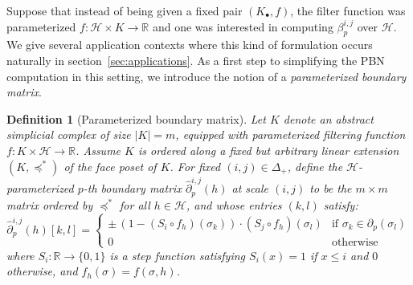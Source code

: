 \documentclass[10pt]{article}
\newcommand{\+}{%
	\raisebox{0.18ex}{\scaleobj{0.55}{+}}
}
\newtheorem{definition}{Definition}
\theoremstyle{definition}
\begin{document}
Suppose that instead of being given a fixed pair $(K_\bullet, f)$, the filter function was parameterized $f : \mathcal{H} \times K \to \mathbb{R}$ and one was interested in computing $\beta_p^{i,j}$ over $\mathcal{H}$. We give several application contexts where this kind of formulation occurs naturally in section~\ref{sec:applications}. As a first step to simplifying the PBN computation in this setting, we introduce the notion of a \emph{parameterized boundary matrix}.
\begin{definition}[Parameterized boundary matrix]\label{def:time_boundary_matrix}
Let $K$ denote an abstract simplicial complex of size $\lvert K \rvert = m$, equipped with parameterized filtering function $f : K \times \mathcal{H} \to \mathbb{R}$. 
Assume $K$ is ordered along a fixed but arbitrary linear extension $(K, \preceq^\ast)$ of the face poset of $K$. For fixed $(i,j) \in \Delta_{+}$, define the $\mathcal{H}$-\emph{parameterized} $p$\emph{-th boundary matrix} $\hat{\partial}_p^{i, j}(h)$ \emph{at scale} $(i,j)$ to be the $m \times m$ matrix ordered by $\preceq^\ast$ for all $h \in \mathcal{H}$, and whose entries $(k,l)$ satisfy:
\begin{equation}
	\hat{\partial}_p^{i,j}(h)[k,l] = \begin{cases}
	\pm \, (1 - (S_{i} \circ f_h)(\sigma_k)) \cdot (S_{j} \circ f_h)(\sigma_l) & \text{if } \sigma_k \in \partial_p(\sigma_l) \\
	0 & \text{otherwise}
\end{cases}
\end{equation}
where $S_{i} : \mathbb{R} \to \{0, 1\}$ is a \emph{step} function satisfying $S_i(x) = 1$ if $x \leq i$ and $0$ otherwise, and $f_h(\sigma) = f(\sigma, h)$.
\end{definition}
\end{document}
